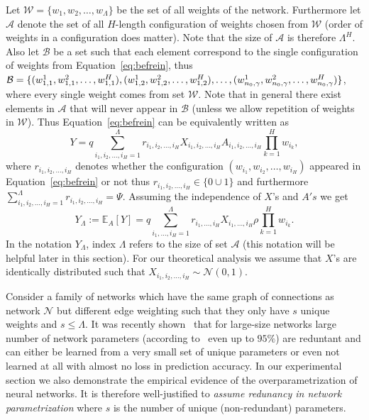 \documentclass[twoside]{article}
\begin{document}
Let $\mathcal{W} = \{w_1,w_2,\dots,w_{\Lambda}\}$ be the set of all weights of the network. Furthermore let $\mathcal{A}$ denote the set of all $H$-length configuration of weights chosen from $\mathcal{W}$ (order of weights in a configuration does matter). Note that the size of $\mathcal{A}$ is therefore $\Lambda^H$. Also let $\mathcal{B}$ be a set such that each element correspond to the single configuration of weights from Equation~\ref{eq:befrein}, thus $\mathcal{B} = \{(w_{1,1}^1,w_{1,1}^2,\dots,w_{1,1}^H),(w_{1,2}^1,w_{1,2}^2,\dots,w_{1,2}^H),\dots,\\(w_{n_0,\gamma}^1,w_{n_0,\gamma}^2,\dots,w_{n_0,\gamma}^H)\}$, where every single weight comes from set $\mathcal{W}$. Note that in general there exist elements in $\mathcal{A}$ that will never appear in $\mathcal{B}$ (unless we allow repetition of weights in $\mathcal{W}$). Thus Equation~\ref{eq:befrein} can be equivalently written as 
\[Y = q\!\!\!\!\sum_{i_1,i_2,\dots,i_H=1}^{\Lambda}\!\!\!r_{i_1,i_2,\dots,i_H}X_{i_1,i_2,\dots,i_H}A_{i_1,i_2,\dots,i_H}\prod_{k = 1}^{H}w_{i_k},
\]
where $r_{i_1,i_2,\dots,i_H}$ denotes whether the configuration $(w_{i_1},w_{i_2},\dots,w_{i_H})$ appeared in Equation~\ref{eq:befrein} or not thus $r_{i_1,i_2,\dots,i_H} \in \{0\cup{1}\}$ and furthermore $\sum_{i_1,i_2,\dots,i_H=1}^{\Lambda}r_{i_1,i_2,\dots,i_H} = \Psi$. Assuming the independence of $X$'s and $A's$ we get
\begin{equation}
Y_{\Lambda} := \mathbb{E}_A[Y] = q\!\!\!\sum_{i_1,\dots,i_H=1}^{\Lambda}\!\!\!r_{i_1,\dots,i_H}X_{i_1,\dots,i_H}\rho\prod_{k = 1}^{H}\!\!w_{i_k}.
\label{eq:befapprox}
\end{equation}
In the notation $Y_{\Lambda}$, index $\Lambda$ refers to the size of set $\mathcal{A}$ (this notation will be helpful later in this section). For our theoretical analysis we assume that $X$'s are identically distributed such that $X_{i_1,i_2,\dots,i_H}\sim\mathcal{N}(0,1)$. 

Consider a family of networks which have the same graph of connections as network $\mathcal{N}$ but different edge weighting such that they only have $s$ unique weights and $s \leq \Lambda$. It was recently shown~\cite{NIPS2013_5025,DBLP:journals/corr/DentonZBLF14} that for large-size networks large number of network parameters (according to~\cite{NIPS2013_5025} even up to $95\%$) are reduntant and can either be learned from a very small set of unique parameters or even not learned at all with almost no loss in prediction accuracy.  In our experimental section we also demonstrate the empirical evidence of the overparametrization of neural networks. It is therefore well-justified to \textit{assume redunancy in network parametrization} where $s$ is the number of unique (non-redundant) parameters.
\end{document}

